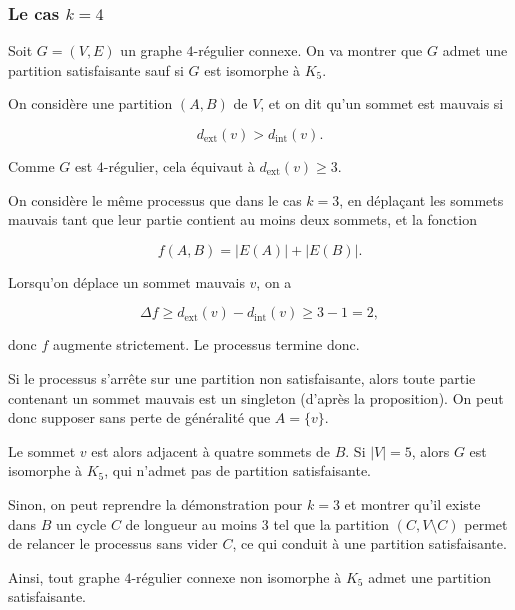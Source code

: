 \subsubsection{Le cas \(k = 4\)}

Soit \(G = (V,E)\) un graphe \(4\)-régulier connexe.
On va montrer que \(G\) admet une partition satisfaisante sauf si \(G\) est isomorphe à \(K_5\).

On considère une partition \((A,B)\) de \(V\), et on dit qu’un sommet est mauvais si

\begin{equation*}
    d_{\mathrm{ext}}(v) > d_{\mathrm{int}}(v).
\end{equation*}

Comme \(G\) est \(4\)-régulier, cela équivaut à \(d_{\mathrm{ext}}(v) \geq 3\).

On considère le même processus que dans le cas \(k=3\), en déplaçant les sommets mauvais tant que leur partie contient au moins deux sommets, et la fonction

\begin{equation*}
    f(A,B) = |E(A)| + |E(B)|.
\end{equation*}

Lorsqu’on déplace un sommet mauvais \(v\), on a

\begin{equation*}
    \Delta f \geq d_{\mathrm{ext}}(v) - d_{\mathrm{int}}(v) \geq 3 - 1 = 2,
\end{equation*}

donc \(f\) augmente strictement. Le processus termine donc.

Si le processus s’arrête sur une partition non satisfaisante, alors toute partie contenant un sommet mauvais est un singleton (d'après la proposition). On peut donc supposer sans perte de généralité que \(A = \{v\}\). %

Le sommet \(v\) est alors adjacent à quatre sommets de \(B\).
Si \(|V| = 5\), alors \(G\) est isomorphe à \(K_5\), qui n’admet pas de partition satisfaisante.

Sinon, on peut reprendre la démonstration pour \(k=3\) et montrer qu’il existe dans \(B\) un cycle \(C\) de longueur au moins 3 tel que la partition \((C, V \setminus C)\) permet de relancer le processus sans vider \(C\), ce qui conduit à une partition satisfaisante.

Ainsi, tout graphe \(4\)-régulier connexe non isomorphe à \(K_5\) admet une partition satisfaisante.